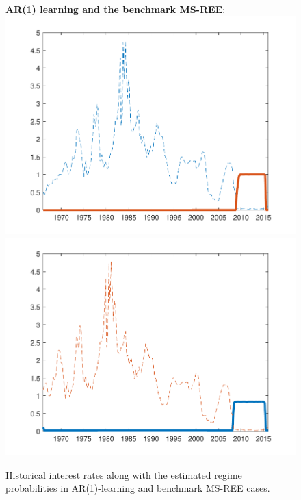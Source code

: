 \documentclass[12pt,reqno]{article}
\numberwithin{equation}{section}
\begin{document}
\begin{figure}[H]

\caption{Historical interest rates along with the estimated regime probabilities in AR(1)-learning and benchmark MS-REE cases. }
\textbf{AR(1) learning and the benchmark MS-REE}:\\
\label{nkpc_regime_prob}
\includegraphics[scale=0.6]{NKPC_ree_init_AR1_regime.pdf} 
\includegraphics[scale=0.6]{NKPC_sigmaPoint_regime.pdf}\\ 





\end{figure}
\end{document}
